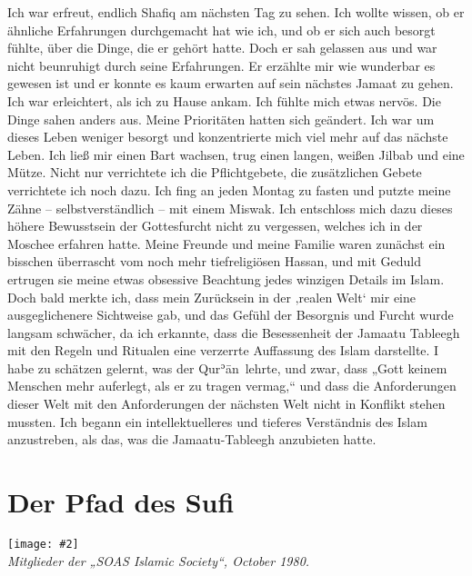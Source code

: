 \documentclass[12pt]{memoir}
\def\´{ʾ} %
\def \Quran{Qur\-\´ān} %
\newcommand{\img}[3]{\begin{center}%
\texttt{[image: \#2]}\\{\small\em#3}%
\end{center}}
\begin{document}
Ich war erfreut, endlich Shafiq am nächsten Tag zu sehen.
Ich wollte wissen, ob er ähnliche Erfahrungen durchgemacht hat wie ich,
und ob er sich auch besorgt fühlte, über die Dinge, die er gehört hatte.
Doch er sah gelassen aus und war nicht beunruhigt durch seine Erfahrungen.
Er erzählte mir wie wunderbar es gewesen ist
und er konnte es kaum erwarten auf sein nächstes Jamaat zu gehen.
Ich war erleichtert, als ich zu Hause ankam.
Ich fühlte mich etwas nervös.
Die Dinge sahen anders aus.
Meine Prioritäten hatten sich geändert.
Ich war um dieses Leben weniger besorgt
und konzentrierte mich viel mehr auf das nächste Leben.
Ich ließ mir einen Bart wachsen, trug einen langen,
weißen Jilbab und eine Mütze.
Nicht nur verrichtete ich die Pflichtgebete,
die zusätzlichen Gebete verrichtete ich noch dazu.
Ich fing an jeden Montag zu fasten und putzte meine Zähne
– selbstverständlich – mit einem Miswak.
Ich entschloss mich dazu dieses höhere Bewusstsein der Gottesfurcht
nicht zu vergessen, welches ich in der Moschee erfahren hatte.
Meine Freunde und meine Familie waren zunächst ein bisschen überrascht
vom noch mehr tiefreligiösen Hassan,
und mit Geduld ertrugen sie meine etwas obsessive Beachtung
jedes winzigen Details im Islam.
Doch bald merkte ich, dass mein Zurücksein in der ‚realen Welt‘
mir eine ausgeglichenere Sichtweise gab,
und das Gefühl der Besorgnis und Furcht wurde langsam schwächer,
da ich erkannte, dass die Besessenheit der Jamaatu Tableegh mit den Regeln
und Ritualen eine verzerrte Auffassung des Islam darstellte.
I habe zu schätzen gelernt, was der \Quran\ lehrte, und zwar,
dass „Gott keinem Menschen mehr auferlegt, als er zu tragen vermag,“
und dass die Anforderungen dieser Welt mit den Anforderungen
der nächsten Welt nicht in Konflikt stehen mussten.
Ich begann ein intellektuelleres und tieferes Verständnis
des Islam anzustreben, als das, was die Jamaatu-Tableegh anzubieten hatte.


\chapter{Der Pfad des Sufi}

\img{scale=0.7}{Members_SOAS_Islamic_Society.jpg}
{Mitglieder der „SOAS Islamic Society“, October 1980.}
\end{document}
